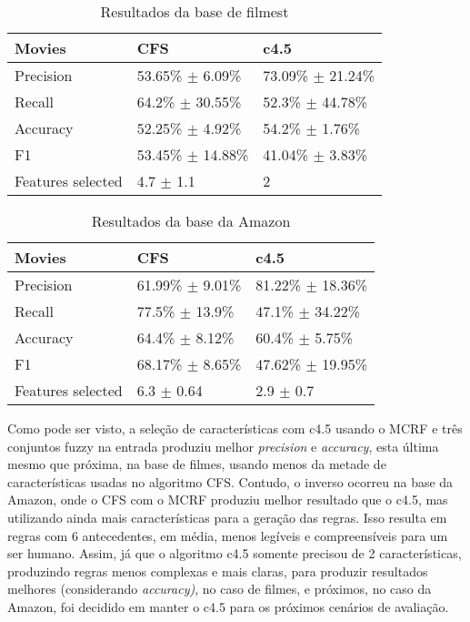 \begin{table}[!h]
    \begin{tabular}{lll}
    Movies         				 & CFS                                 	 	 & c4.5                                  \\ \hline
    Precision                   & 53.65\% $\pm$ 6.09\% 			 & 73.09\% $\pm$ 21.24\% \\
    Recall                        & 64.2\% $\pm$ 30.55\% 		 & 52.3\% $\pm$ 44.78\% \\
    Accuracy                   & 52.25\% $\pm$ 4.92\% 			 & 54.2\% $\pm$ 1.76\% \\
    F1                  			 & 53.45\% $\pm$ 14.88\% 	     & 41.04\% $\pm$ 3.83\% \\
    Features selected      & 4.7 $\pm$ 1.1            			 & 2                                     \\
    \end{tabular}
    \caption{Resultados da base de filmest}
	\label{table:movies}
\end{table}

\begin{table}[!h]
    \begin{tabular}{lll}
    Movies         					& CFS                          		& c4.5                                  \\ \hline
    Precision                     & 61.99\% $\pm$ 9.01\% 	& 81.22\% $\pm$ 18.36\%  \\
    Recall                          & 77.5\% $\pm$ 13.9\% 		& 47.1\% $\pm$ 34.22\% \\
    Accuracy                     & 64.4\% $\pm$ 8.12\% 		& 60.4\% $\pm$ 5.75\% \\
    F1                                & 68.17\% $\pm$ 8.65\% 	& 47.62\% $\pm$ 19.95\% \\
    Features selected 		& 6.3 $\pm$ 0.64               & 2.9 $\pm$ 0.7                                  \\
    \end{tabular}
    \caption{Resultados da base da Amazon}
	\label{table:amazon}
\end{table}

Como pode ser visto, a seleção de características com c4.5 usando o MCRF e três conjuntos fuzzy na entrada produziu melhor \textit{precision} e \textit{accuracy}, esta última mesmo que próxima, na base de filmes, usando menos da metade de características usadas no algoritmo CFS. Contudo, o inverso ocorreu na base da Amazon, onde o CFS com o MCRF produziu melhor resultado que o c4.5, mas utilizando ainda mais características para a geração das regras. Isso resulta em regras com 6 antecedentes, em média, menos legíveis e compreensíveis para um ser humano. Assim, já que o algoritmo c4.5 somente precisou de 2 características, produzindo regras menos complexas e mais claras, para produzir resultados melhores (considerando \textit{accuracy)}, no caso de filmes, e próximos, no caso da Amazon, foi decidido em manter o c4.5 para os próximos cenários de avaliação. 

